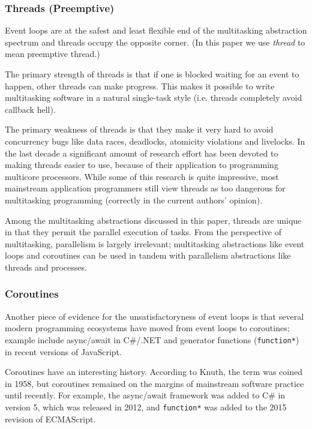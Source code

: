 \documentclass[10pt,preprint]{sigplanconf}
\begin{document}
\subsubsection{Threads (Preemptive)}

Event loops are at the safest and least flexible end of the multitasking abstraction spectrum and threads occupy the opposite corner.
(In this paper we use \emph{thread} to mean preemptive thread.)

The primary strength of threads is that if one is blocked waiting for an event to happen, other threads can make progress.
This makes it possible to write multitasking software in a natural single-task style (i.e. threads completely avoid callback hell).

The primary weakness of threads is that they make it very hard to avoid concurrency bugs like data races, deadlocks, atomicity violations and livelocks.
In the last decade a significant amount of research effort has been devoted to making threads easier to use, because of their application to programming multicore processors.
While some of this research is quite impressive, most mainstream application programmers still view threads as too dangerous for multitasking programming (correctly in the current authors' opinion).

Among the multitasking abstractions discussed in this paper, threads are unique in that they permit the parallel execution of tasks.
From the perspective of multitasking, parallelism is largely irrelevant; multitasking abstractions like event loops and coroutines can be used in tandem with parallelism abstractions like threads and processes.

\subsubsection{Coroutines}

Another piece of evidence for the unsatisfactoryness of event loops is that several modern programming ecosystems have moved from event loops to coroutines; example include async/await in C\#/.NET and generator functions (\texttt{function*}) in recent versions of JavaScript.



Coroutines have an interesting history.
According to Knuth, the term was coined in 1958, but coroutines remained on the margins of mainstream software practice until recently.
For example, the async/await framework was added to C\# in version 5, which was released in 2012, and \texttt{function*} was added to the 2015 revision of ECMAScript.
\end{document}
